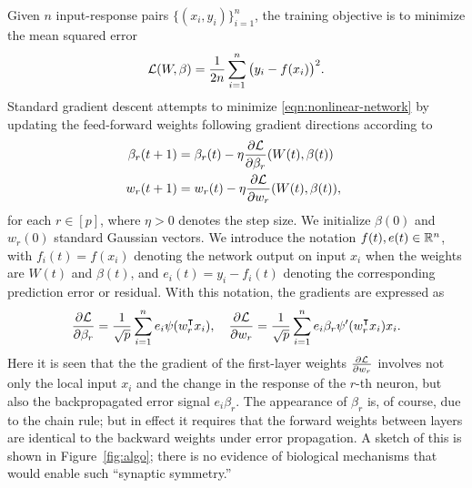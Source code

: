 Given $n$ input-response pairs $\{(x_i,y_i)\}_{i=1}^n$, the training objective is to minimize the mean squared error
\begin{equation}\label{eqn:squared-loss}
    \mathcal{L}(W,\beta) = \frac{1}{2n}\sum_{i=1}^n \big(y_i - f(x_i)\big)^2.
\end{equation}
Standard gradient descent attempts to minimize \eqref{eqn:nonlinear-network} by updating the feed-forward weights following gradient directions according to
\begin{align*}
    \beta_r(t+1) &= \beta_r(t)-\eta\frac{\partial\mathcal{L}}{\partial \beta_r}(W(t),\beta(t)) \quad\\ w_r(t+1) &= w_r(t)-\eta\frac{\partial\mathcal{L}}{\partial w_r}(W(t),\beta(t)),
\end{align*}
for each $r\in[p]$, where $\eta>0$ denotes the step size. We initialize $\beta(0)$ and $w_r(0)$  standard Gaussian vectors. We introduce the notation $f(t), e(t)\in \mathbb{R}^n$, with $f_i(t) = f(x_i)$ denoting the network output on input $x_i$ when the weights are $W(t)$ and $\beta(t)$, and $e_i(t) = y_i-f_i(t)$ denoting the corresponding prediction error or residual. With this notation,
the gradients are expressed as
\begin{equation*}
    \frac{\partial\Loss}{\partial \beta_r} = \frac{1}{\sqrt p}\sum_{i=1}^n e_i\psi(w_r\transpose x_i), \quad
    \frac{\partial\Loss}{\partial w_r} = \frac{1}{\sqrt p} \sum_{i=1}^n e_i \beta_r\psi'(w_r\transpose x_i)x_i.
\end{equation*}
Here it is seen that the the gradient of the first-layer weights $\frac{\partial \mathcal{L}}{\partial w_r}$ involves not only the local input $x_i$ and the change in
the response of the $r$-th neuron, but also the backpropagated error signal $e_i\beta_r$.
The appearance of $\beta_r$ is, of course, due to the chain rule; but in effect it requires that the forward weights between layers are identical to the backward weights under error propagation. A sketch of this is shown in Figure~\ref{fig:algo}; there is no evidence of biological mechanisms
that would enable such ``synaptic symmetry.''

